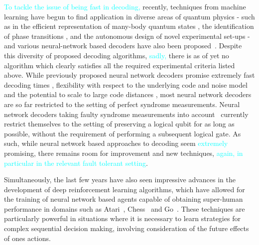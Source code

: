 \documentclass[twocolumn,preprintnumbers,amsmath,amssymb,notitlepage,nofootinbib,longbibliography,superscriptaddress,aps,pra,10pt]{revtex4-1}
\newcommand{\je}[1]{\textcolor{cyan}{#1}}
\begin{document}
	\je{To tackle the issue of being fast in decoding,} recently, techniques from machine learning have begun to find application in diverse areas of quantum physics - such as in the efficient representation of many-body quantum states \cite{WFcarleo2017solving,WFcarleo2018constructing,WFgao2017efficient}, the identification of phase transitions \cite{PTvan2017learning,PTPhysRevB.97.134109,PTcarrasquilla2017machine}, and the autonomous design of novel experimental set-ups \cite{melnikov2018active} - and various neural-network based decoders have also been proposed~\cite{Torlai10, Varsamopoulos17, Krastanov17, Breuckmann18, Baireuther18a, Baireuther18b, Ni18, chamberland2018deep}.
	Despite this diversity of proposed decoding algorithms, \je{sadly,} there is as of yet no algorithm which clearly satisfies all the required experimental criteria listed above.
	While previously proposed neural network decoders promise extremely fast decoding times \cite{chamberland2018deep}, flexibility with respect to the underlying code and noise model \cite{chamberland2018deep, Breuckmann18} and the potential to scale to large code distances \cite{Ni18}, most neural network decoders are so far restricted to the setting of perfect syndrome measurements.
	Neural network decoders taking faulty syndrome measurements into account~\cite{Baireuther18a,Baireuther18b} currently restrict themselves to the setting of preserving a logical qubit for as long as possible, without the requirement of performing a subsequent logical gate.
	As such, while neural network based approaches to decoding seem \je{extremely} promising, there remains room for improvement and new techniques,
	\je{again, in particular in the relevant fault tolerant setting}.

	Simultaneously, the last few years have also seen impressive advances in the development of deep reinforcement learning algorithms, which have allowed for the training of neural network based agents capable of obtaining super-human performance in domains such as Atari~\cite{RLMnih15,RLschaul2015prioritized,RLvan2016deep,RLwang2015dueling}, Chess~\cite{RLsilver2017mastering} and Go~\cite{RLSilver2016,RLSilver17b}.
	These techniques are particularly powerful in situations where it is necessary to learn strategies for complex sequential decision making, involving consideration of the future effects of ones actions.
\end{document}
